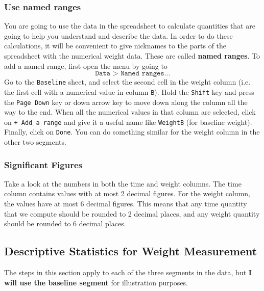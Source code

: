 \subsubsection{Use named ranges}
You are going to use the data in the spreadsheet to calculate quantities that are going to help you understand and describe the data. In order to do these calculations, it will be convenient to give nicknames to the parts of the spreadsheet with the numerical weight data. These are called \textbf{named ranges}. To add a named range, first open the menu by going to
\begin{equation}
    \texttt{Data > Named ranges...}
\end{equation}
Go to the \texttt{Baseline} sheet, and select the second cell in the weight column (i.e. the first cell with a numerical value in column \texttt{B}). Hold the \texttt{Shift} key and press the \texttt{Page Down} key or down arrow key to move down along the column all the way to the end. When all the numerical values in that column are selected, click on \texttt{+ Add a range} and give it a useful name like \texttt{WeightB} (for baseline weight). Finally, click on \texttt{Done}. You can do something similar for the weight column in the other two segments.
\subsubsection{Significant Figures}
Take a look at the numbers in both the time and weight columns. The time column contains values with at most 2 decimal figures. For the weight column, the values have at most 6 decimal figures. This means that any time quantity that we compute should be rounded to 2 decimal places, and any weight quantity should be rounded to 6 decimal places.
\subsection{Descriptive Statistics for Weight Measurement}
The steps in this section apply to each of the three segments in the data, but \textbf{I will use the baseline segment} for illustration purposes.
